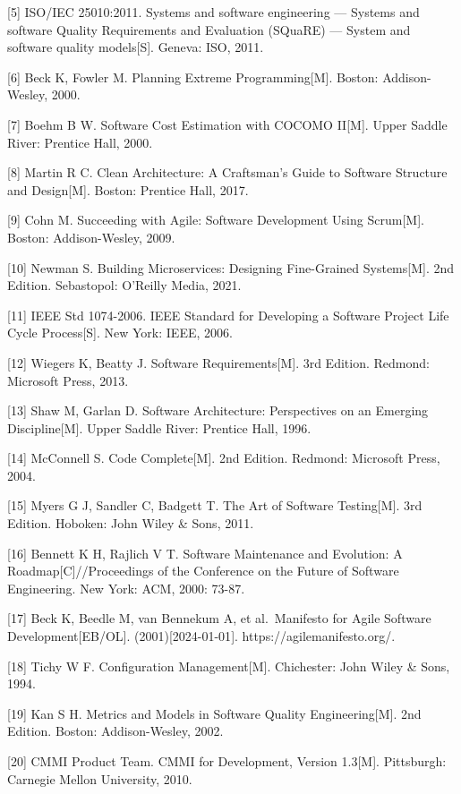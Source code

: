 {[}5{]} ISO/IEC 25010:2011. Systems and software engineering --- Systems
and software Quality Requirements and Evaluation (SQuaRE) --- System and
software quality models{[}S{]}. Geneva: ISO, 2011.

{[}6{]} Beck K, Fowler M. Planning Extreme Programming{[}M{]}. Boston:
Addison-Wesley, 2000.

{[}7{]} Boehm B W. Software Cost Estimation with COCOMO II{[}M{]}. Upper
Saddle River: Prentice Hall, 2000.

{[}8{]} Martin R C. Clean Architecture: A Craftsman's Guide to Software
Structure and Design{[}M{]}. Boston: Prentice Hall, 2017.

{[}9{]} Cohn M. Succeeding with Agile: Software Development Using
Scrum{[}M{]}. Boston: Addison-Wesley, 2009.

{[}10{]} Newman S. Building Microservices: Designing Fine-Grained
Systems{[}M{]}. 2nd Edition. Sebastopol: O'Reilly Media, 2021.

{[}11{]} IEEE Std 1074-2006. IEEE Standard for Developing a Software
Project Life Cycle Process{[}S{]}. New York: IEEE, 2006.

{[}12{]} Wiegers K, Beatty J. Software Requirements{[}M{]}. 3rd Edition.
Redmond: Microsoft Press, 2013.

{[}13{]} Shaw M, Garlan D. Software Architecture: Perspectives on an
Emerging Discipline{[}M{]}. Upper Saddle River: Prentice Hall, 1996.

{[}14{]} McConnell S. Code Complete{[}M{]}. 2nd Edition. Redmond:
Microsoft Press, 2004.

{[}15{]} Myers G J, Sandler C, Badgett T. The Art of Software
Testing{[}M{]}. 3rd Edition. Hoboken: John Wiley \& Sons, 2011.

{[}16{]} Bennett K H, Rajlich V T. Software Maintenance and Evolution: A
Roadmap{[}C{]}//Proceedings of the Conference on the Future of Software
Engineering. New York: ACM, 2000: 73-87.

{[}17{]} Beck K, Beedle M, van Bennekum A, et al.~Manifesto for Agile
Software Development{[}EB/OL{]}. (2001){[}2024-01-01{]}.
https://agilemanifesto.org/.

{[}18{]} Tichy W F. Configuration Management{[}M{]}. Chichester: John
Wiley \& Sons, 1994.

{[}19{]} Kan S H. Metrics and Models in Software Quality
Engineering{[}M{]}. 2nd Edition. Boston: Addison-Wesley, 2002.

{[}20{]} CMMI Product Team. CMMI for Development, Version 1.3{[}M{]}.
Pittsburgh: Carnegie Mellon University, 2010.

